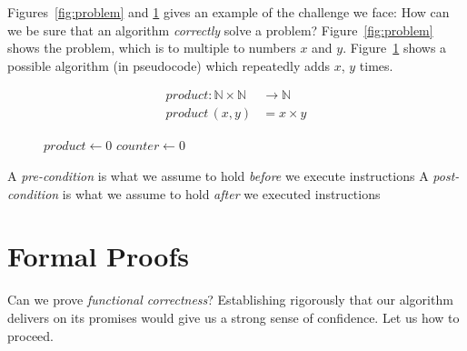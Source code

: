 \documentclass{aldast}
\begin{document}
Figures~\ref{fig:problem} and \ref{fig:algorithm} gives an example of
the challenge we face: How can we be sure that an algorithm
\emph{correctly} solve a problem? Figure~\ref{fig:problem} shows the
problem, which is to multiple to numbers $x$ and
$y$. Figure~\ref{fig:algorithm} shows a possible algorithm (in
pseudocode) which repeatedly adds $x$, $y$ times.

\begin{figure}[htbp]
\centering
\begin{minipage}{.475\textwidth}
  \begin{align*}
    product: \mathbb{N} \times \mathbb{N} & \to \mathbb{N} \\
    product \, (x, y) & =  x \times y
  \end{align*}
  \label{fig:problem}
\end{minipage}%
\hfill
\begin{minipage}{.475\textwidth}
  \begin{center}
  \begin{algorithm}[H]
    $product \gets 0$\;
    $counter \gets 0$\;
  \end{algorithm}
\end{center}
  \label{fig:algorithm}
\end{minipage}
\end{figure}


\begin{takeaway}
  A \emph{pre-condition} is what we assume to hold \emph{before} we execute instructions
  A \emph{post-condition} is what we assume to hold \emph{after} we executed instructions
\end{takeaway}



\section{Formal Proofs}

Can we prove \emph{functional correctness}? Establishing rigorously
that our algorithm delivers on its promises would give us a strong
sense of confidence. Let us how to proceed.
\end{document}
